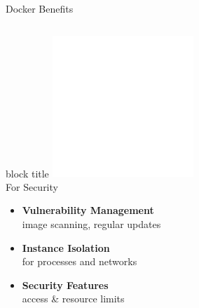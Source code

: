 \documentclass[notes]{beamer}
\begin{document}
{\begin{frame}{Docker Benefits}
\begin{columns}[T]
    \begin{column}{0.32\textwidth}
\begin{beamercolorbox}[shadow=true,rounded=true]{block title}
        \centering 
        \includegraphics[width=0.4\textwidth]{security.png}\\[0.3em]
        For Security
      \end{beamercolorbox}
      \begin{itemize}
        \item \textbf{Vulnerability Management} \\[-0.4em]
        {\tiny image scanning, regular updates}
        \item \textbf{Instance Isolation} \\[-0.4em]
        {\tiny for processes and networks}
        \item \textbf{Security Features} \\[-0.4em]
        {\tiny access \& resource limits}
      \end{itemize}
    \end{column}
  \end{columns}
\end{frame}
}
\end{document}

